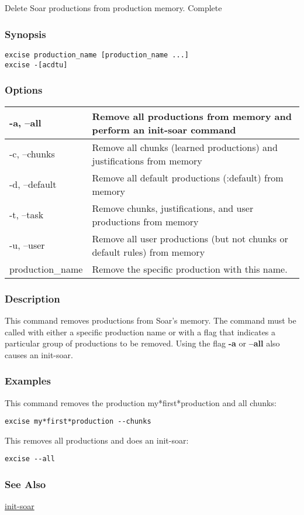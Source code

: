 \subsection{}
\label{excise}
Delete Soar productions from production memory. 
 Complete
\subsubsection*{Synopsis}
  \begin{verbatim}
excise production_name [production_name ...]
excise -[acdtu]
\end{verbatim}
\subsubsection*{Options}
\begin{tabular}{|l|l|}
\hline 
 -a, --all  & Remove all productions from memory and perform an init-soar command  \\
 \hline 
 -c, --chunks  & Remove all chunks (learned productions) and justifications from memory  \\
 \hline 
 -d, --default  & Remove all default productions (:default) from memory  \\
 \hline 
 -t, --task  & Remove chunks, justifications, and user productions from memory  \\
 \hline 
 -u, --user  & Remove all user productions (but not chunks or default rules) from memory  \\
 \hline 
production\_name & Remove the specific production with this name.  \\
 \hline 
\end{tabular}
\subsubsection*{Description}
 This command removes productions from Soar's memory. The command must be called with either a specific production name or with a flag that indicates a particular group of productions to be removed. Using the flag \textbf{-a}
 or \textbf{--all}
 also causes an init-soar. 
\subsubsection*{Examples}
 This command removes the production my*first*production and all chunks: \begin{verbatim}
excise my*first*production --chunks
\end{verbatim}
 This removes all productions and does an init-soar: \begin{verbatim}
excise --all
\end{verbatim}
\subsubsection*{See Also}
\hyperref[init-soar]{init-soar} 